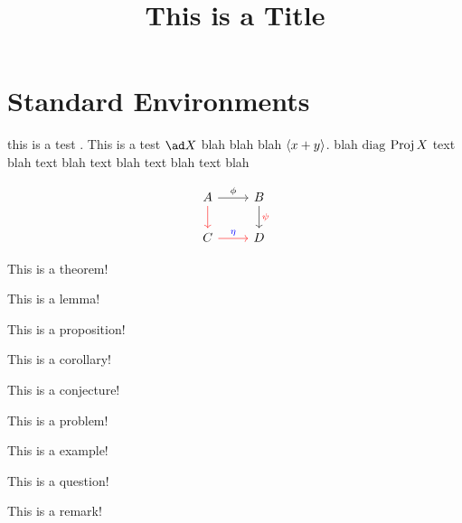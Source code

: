 \documentclass{scrartcl}
\title{This is a Title}
\begin{document}
\maketitle



\section{Standard Environments}

this is a test \rr[2m+3]. This is a test $\ad X$ blah \ff blah blah $\langle x+y\rangle$. blah $\mathrm{diag}$ $\operatorname{Proj} X$ text blah text blah text blah text blah text blah

\[
\begin{tikzcd}
    A \arrow[r, "\phi"] \arrow[d, red]
    & B \arrow[d, "\psi" red] \\
    C \arrow[r, red, "\eta" blue]
    & D
    \end{tikzcd}\]


\begin{theorem}
    This is a theorem!
\end{theorem}
\begin{lemma}
    This is a lemma!
\end{lemma}
\begin{proposition}
    This is a proposition!
\end{proposition}
\begin{corollary}
    This is a corollary!
\end{corollary}
\begin{conjecture}
    This is a conjecture!
\end{conjecture}
\begin{problem}
    This is a problem!
\end{problem}
\begin{example}
    This is a example!
\end{example}
\begin{question}
    This is a question!
\end{question}
\begin{remark}
    This is a remark!
\end{remark}

\newpage
\end{document}
